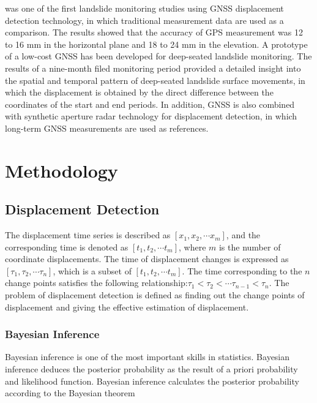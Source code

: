 \documentclass{svjour3}                     %
\begin{document}
\cite{gili2000using} was one of the first landslide monitoring studies using GNSS displacement detection technology, in which traditional measurement data are used as a comparison. The results showed that the accuracy of GPS measurement was 12 to 16 mm in the horizontal plane and 18 to 24 mm in the elevation.
A prototype of a low-cost GNSS has been developed for deep-seated landslide monitoring\citep{rs12203375}. The results of a nine-month filed monitoring period provided a detailed insight into the spatial and temporal pattern of deep-seated landslide surface movements, in which the displacement is obtained by the direct difference between the coordinates of the start and end periods.
In addition, GNSS is also combined with synthetic aperture radar technology for displacement detection, in which long-term GNSS measurements are used as references\citep{atanasova2018ground,fuhrmann2015estimation}.










\section{Methodology}
\label{method}





\subsection{Displacement Detection}
The displacement time series is described as $\left[ {{x_1},{x_2}, \cdots {x_m}} \right]$,  and the corresponding time is denoted as $\left[ {{t_1},{t_2}, \cdots {t_m}} \right]$, where $m$ is the number of coordinate displacements. The time of displacement changes is expressed as $\left[ {{\tau _1},{\tau _2}, \cdots {\tau _n}} \right]$, which is a subset of $\left[ {{t_1},{t_2}, \cdots {t_m}} \right]$.  
The time corresponding to the $n$ change points satisfies the following relationship:$ {{\tau _1}<{\tau _2}<\cdots {\tau _{n-1}}<{\tau _n}} $.
The problem of displacement detection is defined as finding out the change points of displacement and giving the effective estimation of displacement.

\subsubsection{Bayesian Inference}
Bayesian inference is one of the most important skills in statistics. Bayesian inference deduces the posterior probability as the result of a priori probability and likelihood function. Bayesian inference calculates the posterior probability according to the Bayesian theorem
\end{document}
